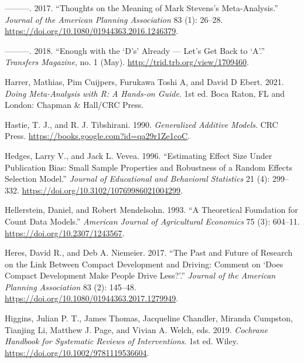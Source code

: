 \documentclass[
  11pt,
  openany]{memoir}
\newlength{\cslhangindent}
\newlength{\cslentryspacingunit} %
\newenvironment{CSLReferences}[2] %
 {%
  \setlength{\parindent}{0pt}
  \ifodd #1
  \let\oldpar\par
  \def\par{\hangindent=\cslhangindent\oldpar}
  \fi
  \setlength{\parskip}{#2\cslentryspacingunit}
 }%
 {}
\begin{document}
\begin{CSLReferences}{1}{0}
\leavevmode{}%
---------. 2017. {``Thoughts on the {Meaning} of {Mark Stevens}'s {Meta}-{Analysis}.''} \emph{Journal of the American Planning Association} 83 (1): 26--28. \url{https://doi.org/10.1080/01944363.2016.1246379}.

\leavevmode{}%
---------. 2018. {``Enough with the {`{D}'s'} {Already} --- {Let}'s {Get Back} to {`{A}'}.''} \emph{Transfers Magazine}, no. 1 (May). \url{http://trid.trb.org/view/1709460}.

\leavevmode{}%
Harrer, Mathias, Pim Cuijpers, Furukawa Toshi A, and David D Ebert. 2021. \emph{Doing Meta-Analysis with {R}: A Hands-on Guide}. 1st ed. {Boca Raton, FL and London}: {Chapman \& Hall/CRC Press}.

\leavevmode{}%
Hastie, T. J., and R. J. Tibshirani. 1990. \emph{Generalized {Additive Models}}. {CRC Press}. \url{https://books.google.com?id=qa29r1Ze1coC}.

\leavevmode{}%
Hedges, Larry V., and Jack L. Vevea. 1996. {``Estimating {Effect Size Under Publication Bias}: Small {Sample Properties} and {Robustness} of a {Random Effects Selection Model}.''} \emph{Journal of Educational and Behavioral Statistics} 21 (4): 299--332. \url{https://doi.org/10.3102/10769986021004299}.

\leavevmode{}%
Hellerstein, Daniel, and Robert Mendelsohn. 1993. {``A {Theoretical Foundation} for {Count Data Models}.''} \emph{American Journal of Agricultural Economics} 75 (3): 604--11. \url{https://doi.org/10.2307/1243567}.

\leavevmode{}%
Heres, David R., and Deb A. Niemeier. 2017. {``The {Past} and {Future} of {Research} on the {Link Between Compact Development} and {Driving}: Comment on {`{Does Compact Development Make People Drive Less}?'}.''} \emph{Journal of the American Planning Association} 83 (2): 145--48. \url{https://doi.org/10.1080/01944363.2017.1279949}.

\leavevmode{}%
Higgins, Julian P. T., James Thomas, Jacqueline Chandler, Miranda Cumpston, Tianjing Li, Matthew J. Page, and Vivian A. Welch, eds. 2019. \emph{Cochrane {Handbook} for {Systematic Reviews} of {Interventions}}. 1st ed. {Wiley}. \url{https://doi.org/10.1002/9781119536604}.


\end{CSLReferences}
\end{document}

